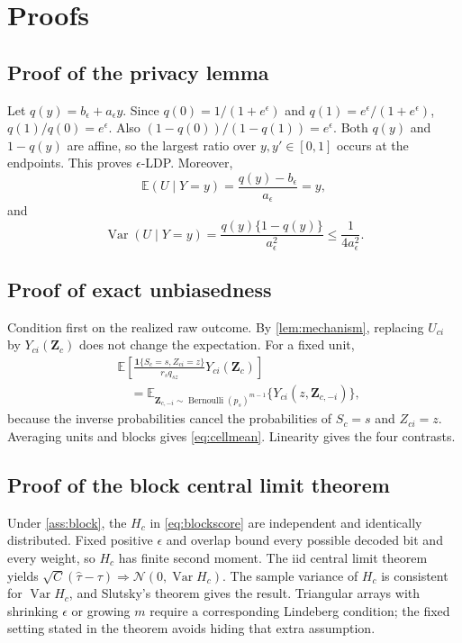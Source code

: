 \documentclass[10pt]{article}
\theoremstyle{definition}
\theoremstyle{remark}
\newcommand{\E}{\mathbb{E}}
\newcommand{\Var}{\operatorname{Var}}
\newcommand{\ind}{\mathbf{1}}
\newcommand{\doisig}{a_{\epsilon}}
\DeclareMathOperator{\Bern}{Bernoulli}
\begin{document}
\clearpage



\appendix

\section{Proofs}
\label{app:proofs}

\subsection{Proof of the privacy lemma}

Let $q(y)=b_{\epsilon}+\doisig y$. Since
$q(0)=1/(1+e^{\epsilon})$ and $q(1)=e^{\epsilon}/(1+e^{\epsilon})$,
$q(1)/q(0)=e^{\epsilon}$. Also
$(1-q(0))/(1-q(1))=e^{\epsilon}$. Both $q(y)$ and $1-q(y)$ are affine, so the largest ratio
over $y,y'\in[0,1]$ occurs at the endpoints. This proves $\epsilon$-LDP. Moreover,
\[
  \E(U\mid Y=y)=\frac{q(y)-b_{\epsilon}}{\doisig}=y,
\]
and
\[
  \Var(U\mid Y=y)=\frac{q(y)\{1-q(y)\}}{\doisig^2}
  \le \frac{1}{4\doisig^2}.
\]

\subsection{Proof of exact unbiasedness}

Condition first on the realized raw outcome. By \cref{lem:mechanism}, replacing $U_{ci}$ by
$Y_{ci}(\mathbf Z_c)$ does not change the expectation. For a fixed unit,
\begin{align*}
&\E\left[
  \frac{\ind\{S_c=s,Z_{ci}=z\}}{r_sq_{sz}}
  Y_{ci}(\mathbf Z_c)
  \right]\\
&\quad=\E_{\mathbf Z_{c,-i}\sim\Bern(p_s)^{m-1}}
  \{Y_{ci}(z,\mathbf Z_{c,-i})\},
\end{align*}
because the inverse probabilities cancel the probabilities of $S_c=s$ and $Z_{ci}=z$.
Averaging units and blocks gives \eqref{eq:cellmean}. Linearity gives the four contrasts.

\subsection{Proof of the block central limit theorem}

Under \cref{ass:block}, the $H_c$ in \eqref{eq:blockscore} are independent and identically
distributed. Fixed positive $\epsilon$ and overlap bound every possible decoded bit and every
weight, so $H_c$ has finite second moment. The iid central limit theorem yields
$\sqrt C(\widehat\tau-\tau)\Rightarrow\mathcal N(0,\Var H_c)$. The sample variance of $H_c$
is consistent for $\Var H_c$, and Slutsky's theorem gives the result. Triangular arrays with
shrinking $\epsilon$ or growing $m$ require a corresponding Lindeberg condition; the fixed
setting stated in the theorem avoids hiding that extra assumption.
\end{document}
